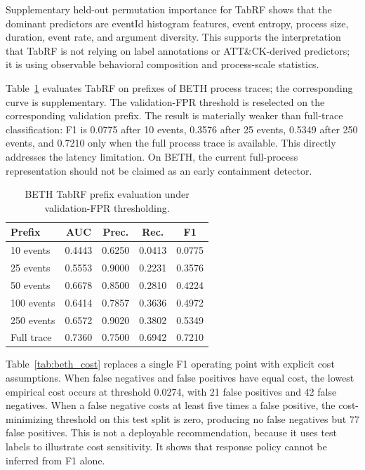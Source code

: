 \documentclass[10pt,journal,compsoc]{IEEEtran}
\begin{document}
Supplementary held-out permutation importance for TabRF shows that the dominant predictors are eventId histogram features, event entropy, process size, duration, event rate, and argument diversity. This supports the interpretation that TabRF is not relying on label annotations or ATT\&CK-derived predictors; it is using observable behavioral composition and process-scale statistics.

Table~\ref{tab:beth_prefix} evaluates TabRF on prefixes of BETH process traces; the corresponding curve is supplementary. The validation-FPR threshold is reselected on the corresponding validation prefix. The result is materially weaker than full-trace classification: F1 is 0.0775 after 10 events, 0.3576 after 25 events, 0.5349 after 250 events, and 0.7210 only when the full process trace is available. This directly addresses the latency limitation. On BETH, the current full-process representation should not be claimed as an early containment detector.

\begin{table}[t]
\centering
\caption{BETH TabRF prefix evaluation under validation-FPR thresholding.}
\label{tab:beth_prefix}
\begin{tabular}{lcccc}
\toprule
\textbf{Prefix} & \textbf{AUC} & \textbf{Prec.} & \textbf{Rec.} & \textbf{F1} \\
\midrule
10 events & 0.4443 & 0.6250 & 0.0413 & 0.0775 \\
25 events & 0.5553 & 0.9000 & 0.2231 & 0.3576 \\
50 events & 0.6678 & 0.8500 & 0.2810 & 0.4224 \\
100 events & 0.6414 & 0.7857 & 0.3636 & 0.4972 \\
250 events & 0.6572 & 0.9020 & 0.3802 & 0.5349 \\
Full trace & 0.7360 & 0.7500 & 0.6942 & 0.7210 \\
\bottomrule
\end{tabular}
\end{table}

Table~\ref{tab:beth_cost} replaces a single F1 operating point with explicit cost assumptions. When false negatives and false positives have equal cost, the lowest empirical cost occurs at threshold 0.0274, with 21 false positives and 42 false negatives. When a false negative costs at least five times a false positive, the cost-minimizing threshold on this test split is zero, producing no false negatives but 77 false positives. This is not a deployable recommendation, because it uses test labels to illustrate cost sensitivity. It shows that response policy cannot be inferred from F1 alone.
\end{document}
